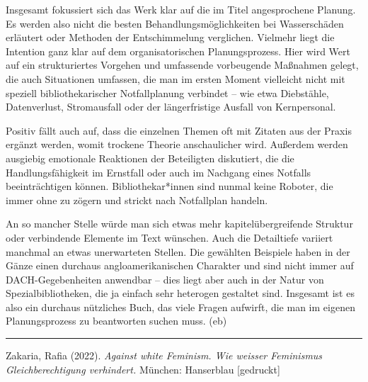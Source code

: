 \documentclass[a4paper,
fontsize=11pt,
oneside,
numbers=noperiodatend,
parskip=half-,
bibliography=totoc,
final
]{scrartcl}
\begin{document}
Insgesamt fokussiert sich das Werk klar auf die im Titel angesprochene
Planung. Es werden also nicht die besten Behandlungsmöglichkeiten bei
Wasserschäden erläutert oder Methoden der Entschimmelung verglichen.
Vielmehr liegt die Intention ganz klar auf dem organisatorischen
Planungsprozess. Hier wird Wert auf ein strukturiertes Vorgehen und
umfassende vorbeugende Maßnahmen gelegt, die auch Situationen umfassen,
die man im ersten Moment vielleicht nicht mit speziell
bibliothekarischer Notfallplanung verbindet -- wie etwa Diebstähle,
Datenverlust, Stromausfall oder der längerfristige Ausfall von
Kernpersonal.

Positiv fällt auch auf, dass die einzelnen Themen oft mit Zitaten aus
der Praxis ergänzt werden, womit trockene Theorie anschaulicher wird.
Außerdem werden ausgiebig emotionale Reaktionen der Beteiligten
diskutiert, die die Handlungsfähigkeit im Ernstfall oder auch im
Nachgang eines Notfalls beeinträchtigen können. Bibliothekar*innen sind
nunmal keine Roboter, die immer ohne zu zögern und strickt nach
Notfallplan handeln.

An so mancher Stelle würde man sich etwas mehr kapitelübergreifende
Struktur oder verbindende Elemente im Text wünschen. Auch die
Detailtiefe variiert manchmal an etwas unerwarteten Stellen. Die
gewählten Beispiele haben in der Gänze einen durchaus
angloamerikanischen Charakter und sind nicht immer auf
DACH-Gegebenheiten anwendbar -- dies liegt aber auch in der Natur von
Spezialbibliotheken, die ja einfach sehr heterogen gestaltet sind.
Insgesamt ist es also ein durchaus nützliches Buch, das viele Fragen
aufwirft, die man im eigenen Planungsprozess zu beantworten suchen muss.
(eb)

\begin{center}\rule{0.5\linewidth}{0.5pt}\end{center}

Zakaria, Rafia (2022). \emph{Against white Feminism. Wie weisser
Feminismus Gleichberechtigung verhindert.} München: Hanserblau
{[}gedruckt{]}
\end{document}
